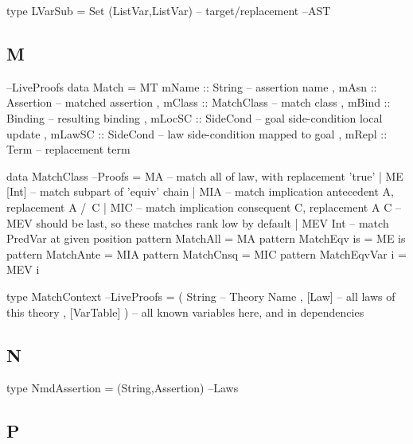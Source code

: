 \begin{code}
type LVarSub = Set (ListVar,ListVar) -- target/replacement              --AST
\end{code}

\subsection{M}

\begin{code}                                                      --LiveProofs
data Match
 = MT { mName  ::  String     -- assertion name
      , mAsn   ::  Assertion  -- matched assertion
      , mClass ::  MatchClass -- match class
      , mBind  ::  Binding    -- resulting binding
      , mLocSC ::  SideCond   -- goal side-condition local update
      , mLawSC ::  SideCond   -- law side-condition mapped to goal
      , mRepl  ::  Term       -- replacement term
      }
\end{code}

\begin{code}
data MatchClass                                                       --Proofs
  = MA       -- match all of law, with replacement 'true'
  | ME [Int] -- match subpart of 'equiv' chain
  | MIA      -- match implication antecedent A, replacement A /\ C
  | MIC      -- match implication consequent C, replacement A \/ C
  -- MEV should be last, so these matches rank low by default
  | MEV Int  -- match PredVar at given position
pattern MatchAll       = MA
pattern MatchEqv is    = ME is
pattern MatchAnte      = MIA
pattern MatchCnsq      = MIC
pattern MatchEqvVar i  = MEV i
\end{code}

\begin{code}
type MatchContext                                                 --LiveProofs
  = ( String       -- Theory Name
    , [Law]        -- all laws of this theory
    , [VarTable] ) -- all known variables here, and in dependencies
\end{code}

\subsection{N}

\begin{code}
type NmdAssertion = (String,Assertion)                                  --Laws
\end{code}

\subsection{P}

